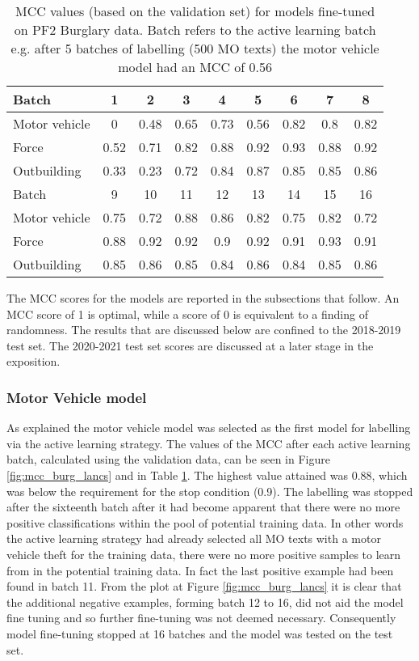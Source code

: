 \begin{table}[]
\centering
\begin{tabular}{@{}lcccccccc@{}}
\toprule
Batch       & 1    & 2    & 3    & 4    & 5    & 6    & 7    & 8    \\ \midrule
Motor vehicle          & 0    & 0.48 & 0.65 & 0.73 & 0.56 & 0.82 & 0.8  & 0.82 \\
Force       & 0.52 & 0.71 & 0.82 & 0.88 & 0.92 & 0.93 & 0.88 & 0.92 \\
Outbuilding & 0.33 & 0.23 & 0.72 & 0.84 & 0.87 & 0.85 & 0.85 & 0.86 \\\midrule
Batch       & 9    & 10   & 11   & 12   & 13   & 14   & 15   & 16   \\\midrule
Motor vehicle         & 0.75 & 0.72 & 0.88 & 0.86 & 0.82 & 0.75 & 0.82 & 0.72 \\
Force       & 0.88 & 0.92 & 0.92 & 0.9  & 0.92 & 0.91 & 0.93 & 0.91 \\
Outbuilding & 0.85 & 0.86 & 0.85 & 0.84 & 0.86 & 0.84 & 0.85 & 0.86 \\ \bottomrule
\end{tabular}
\caption[Batch metrics - PF2 data. All models]{\label{tab:results_1c}MCC values (based on the validation set) for models fine-tuned on PF2 Burglary data. Batch refers to the active learning batch e.g. after 5 batches of labelling (500 MO texts) the motor vehicle model had an MCC of 0.56 }
\end{table}


The MCC scores for the models are reported in the subsections that follow. An MCC score of 1 is optimal, while a score of 0 is equivalent to a finding of randomness. The results that are discussed below are confined to the 2018-2019 test set. The 2020-2021 test set scores are discussed at a later stage in the exposition. 

\subsubsection{Motor Vehicle model} As explained the motor vehicle model was selected as the first model for labelling via the active learning strategy. The values of the MCC after each active learning batch, calculated using the validation data, can be seen in Figure \ref{fig:mcc_burg_lancs} and in Table \ref{tab:results_1c}. The highest value attained was 0.88, which was below the requirement for the stop condition (0.9). The labelling was stopped after the sixteenth batch after it had become apparent that there were no more positive classifications within the pool of potential training data. In other words the active learning strategy had already selected all MO texts with a motor vehicle theft for the training data, there were no more positive samples to learn from in the potential training data. In fact the last positive example had been found in batch 11. From the plot at Figure \ref{fig:mcc_burg_lancs} it is clear that the additional negative examples, forming batch 12 to 16, did not aid the model fine tuning and so further fine-tuning was not deemed necessary. Consequently model fine-tuning stopped at 16 batches and the model was tested on the test set.

